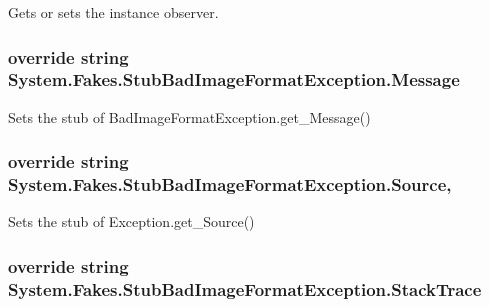 Gets or sets the instance observer.

\hypertarget{class_system_1_1_fakes_1_1_stub_bad_image_format_exception_a658c67c5a6fc4569af690a0045d67251}{
\subsubsection[{Message}]{\setlength{\rightskip}{0pt plus 5cm}override string System.\-Fakes.\-Stub\-Bad\-Image\-Format\-Exception.\-Message\hspace{0.3cm}{\ttfamily [get]}}}\label{class_system_1_1_fakes_1_1_stub_bad_image_format_exception_a658c67c5a6fc4569af690a0045d67251}


Sets the stub of Bad\-Image\-Format\-Exception.\-get\-\_\-\-Message()

\hypertarget{class_system_1_1_fakes_1_1_stub_bad_image_format_exception_a42d0f502aa004a55deeac8b57a895e40}{
\subsubsection[{Source}]{\setlength{\rightskip}{0pt plus 5cm}override string System.\-Fakes.\-Stub\-Bad\-Image\-Format\-Exception.\-Source\hspace{0.3cm}{\ttfamily [get]}, {\ttfamily [set]}}}\label{class_system_1_1_fakes_1_1_stub_bad_image_format_exception_a42d0f502aa004a55deeac8b57a895e40}


Sets the stub of Exception.\-get\-\_\-\-Source()

\hypertarget{class_system_1_1_fakes_1_1_stub_bad_image_format_exception_a298eaf372f6d7e0172955fee217cba8c}{
\subsubsection[{Stack\-Trace}]{\setlength{\rightskip}{0pt plus 5cm}override string System.\-Fakes.\-Stub\-Bad\-Image\-Format\-Exception.\-Stack\-Trace\hspace{0.3cm}{\ttfamily [get]}}}\label{class_system_1_1_fakes_1_1_stub_bad_image_format_exception_a298eaf372f6d7e0172955fee217cba8c}


